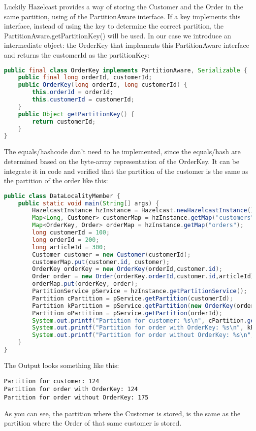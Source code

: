 Luckily Hazelcast provides a way of storing the Customer and the Order in the same partition, using of the PartitionAware interface. If a key implements this interface, instead of using the key to determine the correct partition, the PartitionAware.getPartitionKey() will be used. In our case we introduce an intermediate object: the OrderKey that implements this PartitionAware interface and returns the customerId as the partitionKey:
\begin{lstlisting}[language=java]
public final class OrderKey implements PartitionAware, Serializable {
    public final long orderId, customerId;
    public OrderKey(long orderId, long customerId) {
        this.orderId = orderId;
        this.customerId = customerId;
    }
    public Object getPartitionKey() {
        return customerId;
    }
}
\end{lstlisting}
The equals/hashcode don't need to be implemented, since the equals/hash are determined based on the byte-array representation of the OrderKey. It can be integrate it in code and verified that the partition of the customer is the same as the partition of the order like this:
\begin{lstlisting}[language=java]
public class DataLocalityMember {
    public static void main(String[] args) {
        HazelcastInstance hzInstance = Hazelcast.newHazelcastInstance();
        Map<Long, Customer> customerMap = hzInstance.getMap("customers");
        Map<OrderKey, Order> orderMap = hzInstance.getMap("orders");
        long customerId = 100;
        long orderId = 200;
        long articleId = 300;
        Customer customer = new Customer(customerId);
        customerMap.put(customer.id, customer);
        OrderKey orderKey = new OrderKey(orderId,customer.id);
        Order order = new Order(orderKey.orderId,customer.id,articleId);
        orderMap.put(orderKey, order);
        PartitionService pService = hzInstance.getPartitionService();
        Partition cPartition = pService.getPartition(customerId);
        Partition kPartition = pService.getPartition(new OrderKey(orderId, customerId));
        Partition oPartition = pService.getPartition(orderId);
        System.out.printf("Partition for customer: %s\n", cPartition.getPartitionId());
        System.out.printf("Partition for order with OrderKey: %s\n", kPartition.getPartitionId());
        System.out.printf("Partition for order without OrderKey: %s\n", oPartition.getPartitionId());
    }
}
\end{lstlisting}
The Output looks something like this:
\begin{lstlisting}
Partition for customer: 124
Partition for order with OrderKey: 124
Partition for order without OrderKey: 175
\end{lstlisting}
As you can see, the partition where the Customer is stored, is the same as the partition where the Order of that same customer is stored. 

